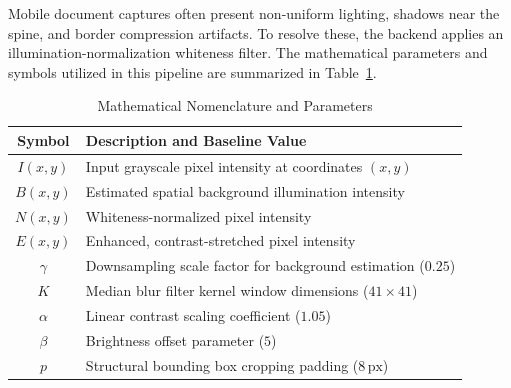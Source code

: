 \documentclass[conference]{IEEEtran}
\begin{document}
Mobile document captures often present non-uniform lighting, shadows near the spine, and border compression artifacts. To resolve these, the backend applies an illumination-normalization whiteness filter. The mathematical parameters and symbols utilized in this pipeline are summarized in Table~\ref{tab:nomenclature}.

\begin{table}[htbp]
\caption{Mathematical Nomenclature and Parameters}
\begin{center}
\footnotesize
\begin{tabular}{|c|p{5.5cm}|}
\hline
\textbf{Symbol} & \textbf{Description and Baseline Value} \\
\hline
\(I(x,y)\) & Input grayscale pixel intensity at coordinates \((x,y)\) \\
\(B(x,y)\) & Estimated spatial background illumination intensity \\
\(N(x,y)\) & Whiteness-normalized pixel intensity \\
\(E(x,y)\) & Enhanced, contrast-stretched pixel intensity \\
\(\gamma\) & Downsampling scale factor for background estimation (\(0.25\)) \\
\(K\) & Median blur filter kernel window dimensions (\(41 \times 41\)) \\
\(\alpha\) & Linear contrast scaling coefficient (\(1.05\)) \\
\(\beta\) & Brightness offset parameter (\(5\)) \\
\(p\) & Structural bounding box cropping padding (\(8\,\text{px}\)) \\
\hline
\end{tabular}
\label{tab:nomenclature}
\end{center}
\end{table}
\end{document}
